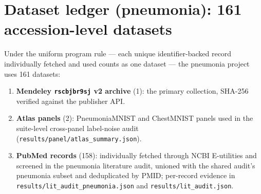 \section{Dataset ledger (pneumonia): 161 accession-level datasets}
Under the uniform program rule --- each unique identifier-backed record
individually fetched and used counts as one dataset --- the pneumonia
project uses 161 datasets:
\begin{enumerate}
\item \textbf{Mendeley \texttt{rscbjbr9sj} v2 archive} (1): the primary
collection, SHA-256 verified against the publisher API.
\item \textbf{Atlas panels} (2): PneumoniaMNIST and ChestMNIST panels
used in the suite-level cross-panel label-noise audit
(\texttt{results/panel/atlas\_summary.json}).
\item \textbf{PubMed records} (158): individually fetched through NCBI
E-utilities and screened in the pneumonia literature audit, unioned with
the shared audit's pneumonia subset and deduplicated by PMID;
per-record evidence in \texttt{results/lit\_audit\_pneumonia.json} and
\texttt{results/lit\_audit.json}.
\end{enumerate}
